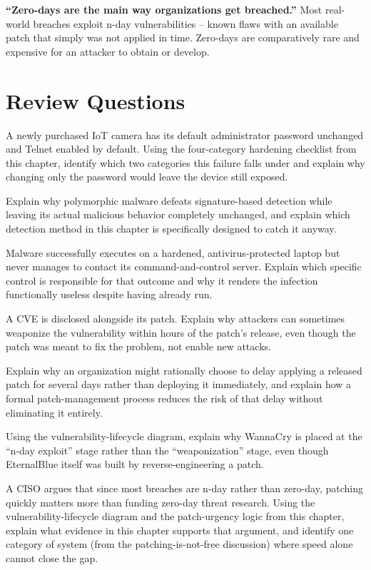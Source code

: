 \begin{misconception}
\textbf{``Zero-days are the main way organizations get breached.''} Most real-world breaches exploit
n-day vulnerabilities -- known flaws with an available patch that simply was not applied in time.
Zero-days are comparatively rare and expensive for an attacker to obtain or develop.
\end{misconception}

\section*{Review Questions}
\begin{reviewquestions}
\item A newly purchased IoT camera has its default administrator password unchanged and Telnet
enabled by default. Using the four-category hardening checklist from this chapter, identify which
two categories this failure falls under and explain why changing only the password would leave the
device still exposed.
\item Explain why polymorphic malware defeats signature-based detection while leaving its actual
malicious behavior completely unchanged, and explain which detection method in this chapter is
specifically designed to catch it anyway.
\item Malware successfully executes on a hardened, antivirus-protected laptop but never manages to
contact its command-and-control server. Explain which specific control is responsible for that
outcome and why it renders the infection functionally useless despite having already run.
\item A CVE is disclosed alongside its patch. Explain why attackers can sometimes weaponize the
vulnerability within hours of the patch's release, even though the patch was meant to fix the
problem, not enable new attacks.
\item Explain why an organization might rationally choose to delay applying a released patch for
several days rather than deploying it immediately, and explain how a formal patch-management
process reduces the risk of that delay without eliminating it entirely.
\item Using the vulnerability-lifecycle diagram, explain why WannaCry is placed at the
``n-day exploit'' stage rather than the ``weaponization'' stage, even though EternalBlue itself
was built by reverse-engineering a patch.
\item A CISO argues that since most breaches are n-day rather than zero-day, patching quickly
matters more than funding zero-day threat research. Using the vulnerability-lifecycle diagram and
the patch-urgency logic from this chapter, explain what evidence in this chapter supports that
argument, and identify one category of system (from the patching-is-not-free discussion) where
speed alone cannot close the gap.
\end{reviewquestions}

